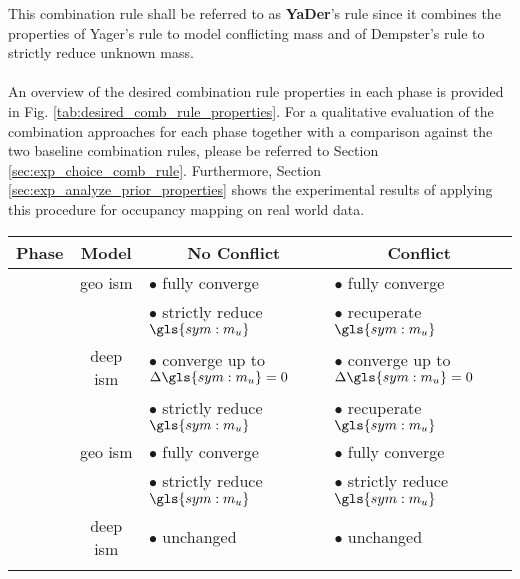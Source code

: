 This combination rule shall be referred to as \textbf{YaDer}'s rule since it combines the properties of Yager's rule to model conflicting mass and of Dempster's rule to strictly reduce unknown mass. 
\\\\
An overview of the desired combination rule properties in each phase is provided in Fig. \ref{tab:desired_comb_rule_properties}. For a qualitative evaluation of the combination approaches for each phase together with a comparison against the two baseline combination rules, please be referred to Section \ref{sec:exp_choice_comb_rule}. Furthermore, Section \ref{sec:exp_analyze_prior_properties} shows the experimental results of applying this procedure for occupancy mapping on real world data. 
\begin{center}
	\begin{tabular}{c|c|l|l}
		\multicolumn{1}{c|}{\bfseries Phase} & 
		\multicolumn{1}{c|}{\bfseries Model} &  	
		\multicolumn{1}{c|}{\bfseries No Conflict} &  	
		\multicolumn{1}{c}{\bfseries Conflict}\\
\hline
		\parbox[t]{5mm}{}
		& geo \gls{ism}
		& $\bullet$ fully converge & $\bullet$ fully converge \\
		&
		& $\bullet$ strictly reduce $\gls{sym:m_u}$& $\bullet$ recuperate $\gls{sym:m_u}$ \\
		& deep \gls{ism}
		& $\bullet$ converge up to $\Delta \gls{sym:m_u} = 0$ & $\bullet$ converge up to $\Delta \gls{sym:m_u} = 0$ \\
		&
		& $\bullet$ strictly reduce $\gls{sym:m_u}$ & $\bullet$ recuperate $\gls{sym:m_u}$ \\
\hline
\hline
	\parbox[t]{5mm}{} 
	& geo \gls{ism}
	& $\bullet$ fully converge & $\bullet$ fully converge \\
	& 
	& $\bullet$ strictly reduce $\gls{sym:m_u}$ & $\bullet$ strictly reduce $\gls{sym:m_u}$ \\
	&deep \gls{ism}
	& $\bullet$ unchanged & $\bullet$ unchanged \\
	&&&
	\end{tabular}
\end{center} 